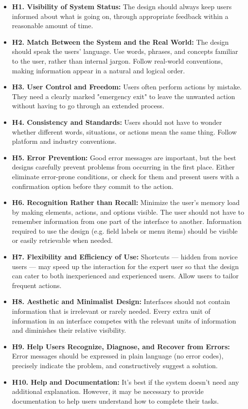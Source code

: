 \begin{itemize}
\item \textbf{H1. Visibility of System Status:} The design should always keep users informed about what is going on, through appropriate feedback within a reasonable amount of time.
\item \textbf{H2. Match Between the System and the Real World:} The design should speak the users' language. Use words, phrases, and concepts familiar to the user, rather than internal jargon. Follow real-world conventions, making information appear in a natural and logical order.
\item \textbf{H3. User Control and Freedom:} Users often perform actions by mistake. They need a clearly marked "emergency exit" to leave the unwanted action without having to go through an extended process.
\item \textbf{H4. Consistency and Standards:} Users should not have to wonder whether different words, situations, or actions mean the same thing. Follow platform and industry conventions.
\item \textbf{H5. Error Prevention:} Good error messages are important, but the best designs carefully prevent problems from occurring in the first place. Either eliminate error-prone conditions, or check for them and present users with a confirmation option before they commit to the action.
\item \textbf{H6. Recognition Rather than Recall:} Minimize the user's memory load by making elements, actions, and options visible. The user should not have to remember information from one part of the interface to another. Information required to use the design (e.g. field labels or menu items) should be visible or easily retrievable when needed.
\item \textbf{H7. Flexibility and Efficiency of Use:} Shortcuts — hidden from novice users — may speed up the interaction for the expert user so that the design can cater to both inexperienced and experienced users. Allow users to tailor frequent actions.
\item \textbf{H8. Aesthetic and Minimalist Design:} Interfaces should not contain information that is irrelevant or rarely needed. Every extra unit of information in an interface competes with the relevant units of information and diminishes their relative visibility.
\item \textbf{H9. Help Users Recognize, Diagnose, and Recover from Errors:} Error messages should be expressed in plain language (no error codes), precisely indicate the problem, and constructively suggest a solution.
\item \textbf{H10. Help and Documentation:} It’s best if the system doesn’t need any additional explanation. However, it may be necessary to provide documentation to help users understand how to complete their tasks.
\end{itemize}

